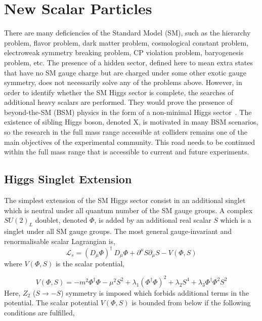 \section{New Scalar Particles}
\label{NSP}
There are many deficiencies of the Standard Model (SM), such as the hierarchy problem,
flavor problem, dark matter problem, cosmological constant problem, electroweak symmetry breaking problem, CP violation problem, baryogenesis problem, etc.
The presence of a hidden sector, defined here to mean extra states that
have no SM gauge charge but are charged under some other exotic gauge symmetry, does not necessarily solve any of the problems above. However, in order to identify whether the SM Higgs sector is complete,  the searches of additional heavy scalars are performed.  They would prove the presence of beyond-the-SM (BSM) physics in the form of a non-minimal Higgs sector~\cite{Robens:2015gla}. The existence of sibling Higgs boson, denoted X, is motivated in many BSM scenarios, so the research in the full mass range accessible at colliders  remains one of the main objectives of the experimental community. This  road  needs  to  be continued within the full mass range that is accessible to current and future experiments.
\newline
\subsection*{Higgs Singlet Extension}
The simplest extension of the SM Higgs sector consist in an additional singlet which is neutral under all quantum number of the SM gauge groups.
A complex $SU(2)_L$ doublet,  denoted $\Phi$, is added by an additional real scalar $S$ which is a singlet under all SM gauge groups. 
The most general gauge-invariant and renormalisable scalar Lagrangian is,
\begin{equation}
 \mathcal{L}_s = (D_{\mu} \Phi )^{\dagger}  \: D_{\mu} \Phi  +  \partial^{\mu}S   \partial_{\mu}S -V(\Phi, S)     \end{equation}
where $V(\Phi, S) $ is the scalar potential,  

\begin{equation}
 V(\Phi, S)= -m^2   \Phi ^{\dagger}\Phi -\mu^2 S^2 +\lambda_1 (\Phi ^{\dagger}\Phi)^2 +\lambda_2 S^4 + \lambda_3 \Phi ^{\dagger}\Phi^2 S^2  \end{equation}
Here, $Z_2$ ($S \rightarrow -S$) symmetry is imposed which forbids additional terms in the potential.
The scalar potential $V(\Phi, S)$ is bounded from below if the following conditions are fulfilled,

